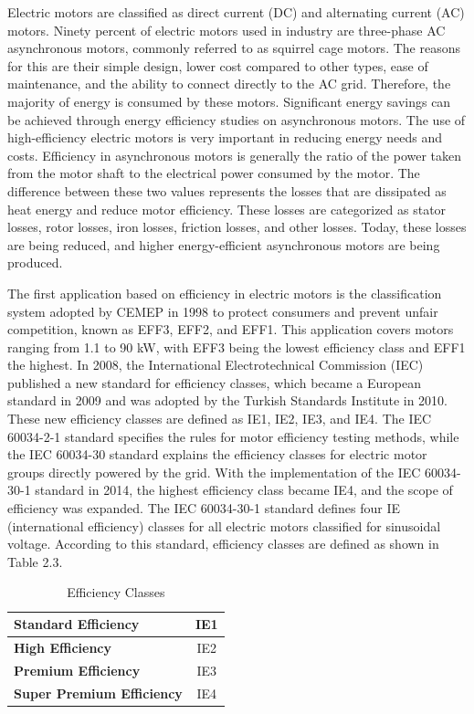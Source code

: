 Electric motors are classified as direct current (DC) and alternating current (AC) motors. Ninety percent of electric motors used in industry are three-phase AC asynchronous motors, commonly referred to as squirrel cage motors. The reasons for this are their simple design, lower cost compared to other types, ease of maintenance, and the ability to connect directly to the AC grid. Therefore, the majority of energy is consumed by these motors. Significant energy savings can be achieved through energy efficiency studies on asynchronous motors. The use of high-efficiency electric motors is very important in reducing energy needs and costs. Efficiency in asynchronous motors is generally the ratio of the power taken from the motor shaft to the electrical power consumed by the motor. The difference between these two values represents the losses that are dissipated as heat energy and reduce motor efficiency. These losses are categorized as stator losses, rotor losses, iron losses, friction losses, and other losses. Today, these losses are being reduced, and higher energy-efficient asynchronous motors are being produced.

The first application based on efficiency in electric motors is the classification system adopted by CEMEP in 1998 to protect consumers and prevent unfair competition, known as EFF3, EFF2, and EFF1. This application covers motors ranging from 1.1 to 90 kW, with EFF3 being the lowest efficiency class and EFF1 the highest. In 2008, the International Electrotechnical Commission (IEC) published a new standard for efficiency classes, which became a European standard in 2009 and was adopted by the Turkish Standards Institute in 2010. These new efficiency classes are defined as IE1, IE2, IE3, and IE4. The IEC 60034-2-1 standard specifies the rules for motor efficiency testing methods, while the IEC 60034-30 standard explains the efficiency classes for electric motor groups directly powered by the grid. With the implementation of the IEC 60034-30-1 standard in 2014, the highest efficiency class became IE4, and the scope of efficiency was expanded. The IEC 60034-30-1 standard defines four IE (international efficiency) classes for all electric motors classified for sinusoidal voltage. According to this standard, efficiency classes are defined as shown in Table 2.3.

\begin{table}[h!]
\centering
\begin{tabular}{|l|c|}
\hline
\textbf{Standard Efficiency} & IE1 \\ \hline
\textbf{High Efficiency}   & IE2 \\ \hline
\textbf{Premium Efficiency}  & IE3 \\ \hline
\textbf{Super Premium Efficiency } & IE4 \\ \hline
\end{tabular}
\caption{Efficiency Classes}
\end{table}

